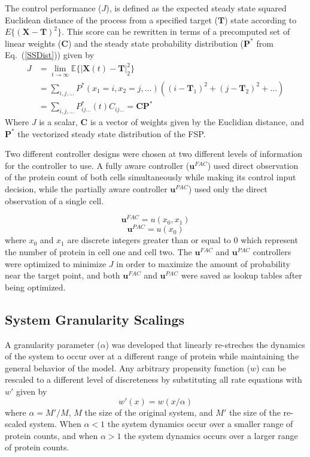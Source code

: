 \documentclass[12pt]{article}
\begin{document}
 The control performance ($J$), is defined as the expected steady state squared Euclidean distance of the process from a specified target ($\mathbf{T}$) state according to $E\{(\mathbf{X}-\mathbf{T})^2\}$. This score can be rewritten in terms of a precomputed set of linear weights ($\mathbf{C}$) and the steady state probability distribution ($\mathbf{P}^*$ from Eq.\ (\ref{SSDist})) given by
{\small \begin{align}
J&= \lim_{t\rightarrow \infty}\mathbb{E}\{|\mathbf{X}(t)-\mathbf{T}|_2^2\} \nonumber \\ 
&=\sum_{i,j,\ldots} P^*(x_1=i,x_2=j,\ldots) ((i-\mathbf T_1)^2 + (j-\mathbf T_2)^2 +\ldots)\nonumber  \\
&=\sum_{i,j,\ldots} P^*_{ij\ldots}(t)C_{ij\ldots} =\mathbf{C}\mathbf{P}^*
\label{Euclid}
\end{align}}
Where $J$ is a scalar, $\mathbf{C}$ is a vector of weights given by the Euclidian distance, and $\mathbf{P}^*$ the vectorized steady state distribution of the FSP.

Two different controller designs were chosen at two different levels of information for the controller to use. A fully aware controller ($\mathbf{u}^{FAC}$) used direct observation of the protein count of both cells simultaneously while making its control input decision, while the partially aware controller $\mathbf{u}^{PAC}$) used only the direct observation of a single cell. 

\begin{equation}
\mathbf{u}^{FAC}=u(x_0,x_1)
\end{equation}
\begin{equation}
\mathbf{u}^{PAC}=u(x_0)
\end{equation}
where $x_0$ and $x_1$ are discrete integers greater than or equal to 0 which represent the number of protein in cell one and cell two.  The $\mathbf{u}^{FAC}$ and $\mathbf{u}^{PAC}$ controllers were optimized to minimize $J$ in order to maximize the amount of probability near the target point, and both $\mathbf{u}^{FAC}$ and $\mathbf{u}^{PAC}$ were saved as lookup tables after being optimized.

\subsection{System Granularity Scalings}
A granularity parameter ($\alpha$) was developed that linearly re-streches the dynamics of the system to occur over at a different range of protein while maintaining the general behavior of the model.  Any arbitrary propensity function ($w$) can be rescaled to a different level of discreteness by substituting all rate equations with $w'$ given by
\begin{equation}
w'(x)=w(x/\alpha)
\end{equation}
where $\alpha=M'/M$, $M$ the size of the original system, and $M'$ the size of the re-scaled system. When $\alpha <1 $ the system dynamics occur over a smaller range of protein counts, and when $\alpha >1$ the system dynamics occurs over a larger range of protein counts. 
\end{document}

